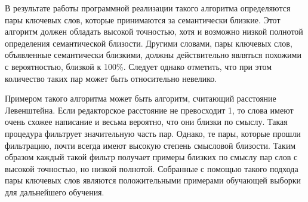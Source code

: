 В результате работы программной реализации такого алгоритма определяются пары ключевых слов, которые принимаются за семантически близкие. Этот алгоритм должен обладать высокой точностью, хотя и возможно низкой полнотой определения семантической близости.  Другими словами, пары ключевых слов, объявленные семантически близкими, должны действительно являться похожими с вероятностью, близкой к 100\%. Следует однако отметить, что при этом количество таких пар может быть относительно невелико.

Примером такого алгоритма может быть алгоритм, считающий расстояние Левенштейна. Если редакторское расстояние не превосходит 1, то слова имеют очень схожее написание и  весьма вероятно, что они близки по смыслу. Такая процедура фильтрует значительную часть пар. Однако, те пары, которые прошли фильтрацию, почти всегда  имеют высокую степень смысловой близости. Таким образом каждый такой фильтр получает примеры близких по смыслу пар слов с высокой точностью, но низкой полнотой. Собранные с помощью такого подхода пары ключевых слов являются положительными примерами обучающей выборки для дальнейшего обучения.

